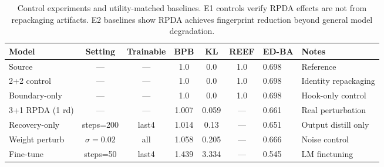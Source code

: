 \begin{table}[t]
\centering
\caption{Control experiments and utility-matched baselines. E1 controls verify RPDA effects are not from repackaging artifacts. E2 baselines show RPDA achieves fingerprint reduction beyond general model degradation.}
\label{tab:controls}
\small
\begin{tabular}{lcccccl}
\toprule
Model & Setting & Trainable & BPB & KL & REEF & ED-BA & Notes \\
\midrule
  Source & — & — & 1.0 & 0.0 & 1.0 & 0.698 & Reference \\
  2+2 control & — & — & 1.0 & 0.0 & 1.0 & 0.698 & Identity repackaging \\
  Boundary-only & — & — & 1.0 & 0.0 & 1.0 & 0.698 & Hook-only control \\
  3+1 RPDA (1 rd) & — & — & 1.007 & 0.059 & — & 0.661 & Real perturbation \\
  \midrule Recovery-only & steps=200 & last4 & 1.014 & 0.13 & — & 0.651 & Output distill only \\
  Weight perturb & $\sigma{=}0.02$ & all & 1.058 & 0.205 & — & 0.666 & Noise control \\
  Fine-tune & steps=50 & last4 & 1.439 & 3.334 & — & 0.545 & LM finetuning \\
\bottomrule
\end{tabular}
\end{table}